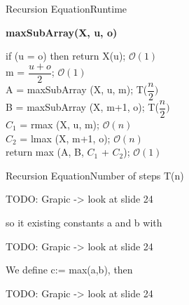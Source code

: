 
\begin{frame}{Recursion Equation}{Runtime}
	
	\textbf{maxSubArray(X, u, o)} \vspace{2em}
	
	if (u = o) then return X(u);\hspace{4em} $\mathcal{O}(1)$\\\vspace{0.5em}
	m = $\dfrac{u+o}{2}$;\hspace{10.7em} $\mathcal{O}(1)$\\\vspace{0.5em}
	A = maxSubArray (X, u, m);\hspace{3.1em} T($\dfrac{n}{2})$\\\vspace{0.5em}
	B = maxSubArray (X, m+1, o);\hspace{1.9em} T($\dfrac{n}{2})$\\\vspace{0.5em}
	$C_1$ = rmax (X, u, m);\hspace{6.2em} $\mathcal{O}(n)$\\\vspace{0.5em}
	$C_2$ = lmax (X, m+1, o);\hspace{5.2em} $\mathcal{O}(n)$\\\vspace{0.5em}
	return max (A, B, $C_1$ + $C_2$);\hspace{3.3em} $\mathcal{O}(1)$
\end{frame}


\begin{frame}{Recursion Equation}{Number of steps T(n)}
	
	TODO: Grapic -> look at slide 24 \vspace{2em}
	
	so it existing constants a and b with\\\vspace{2em}
	
	TODO: Grapic -> look at slide 24 \vspace{2em}
	
	We define c:= max(a,b), then\\\vspace{2em}
	
	TODO: Grapic -> look at slide 24
	
\end{frame}

